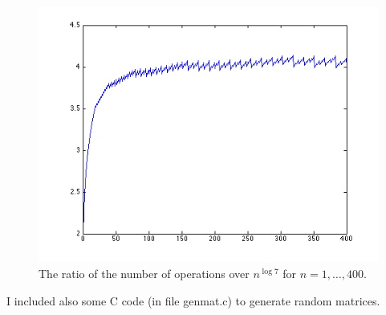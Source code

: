\documentclass{article}
\begin{document}
\begin{figure}[h]
\vspace{.2in}
\centerline {
	\includegraphics[scale=.6]{rat_400.png}
}
\caption{The ratio of the number of operations over $ n^{\log 7} $ for $ n = 1, \ldots, 400 $. \label{rat_400}}
\end{figure}

I included also some C code (in file genmat.c) to generate random matrices.
\end{document}
